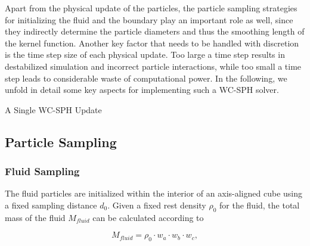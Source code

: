 \documentclass[
	11pt, 
	DIV10,
	ngerman,
	a4paper, 
	oneside, 
	headings=normal, 
	captions=tableheading,
	final, 
	numbers=noenddot
]{scrartcl}
\begin{document}
Apart from the physical update of the particles, the particle sampling strategies for initializing the fluid and the boundary play an important role as well, since they indirectly determine the particle diameters and thus the smoothing length of the kernel function. Another key factor that needs to be handled with discretion is the time step size of each physical update. Too large a time step results in destabilized simulation and incorrect particle interactions, while too small a time step leads to considerable waste of computational power. In the following, we unfold in detail some key aspects for implementing such a WC-SPH solver.

\large
\begin{algorithm}
	\DontPrintSemicolon
	\SetAlgoLined
	\caption{\label{alg1} A Single WC-SPH Update}
\end{algorithm}
\normalsize

\subsection{Particle Sampling}
\subsubsection{Fluid Sampling}

The fluid particles are initialized within the interior of an axis-aligned cube using a fixed sampling distance $ d_{0} $. Given a fixed rest density $ \rho_{0} $ for the fluid, the total mass of the fluid $ M_{fluid} $ can be calculated according to

\begin{equation}
	\label{eq1}
	M_{fluid} = \rho_{0} \cdot w_{a} \cdot w_{b} \cdot w_{c},
\end{equation}
\end{document}
